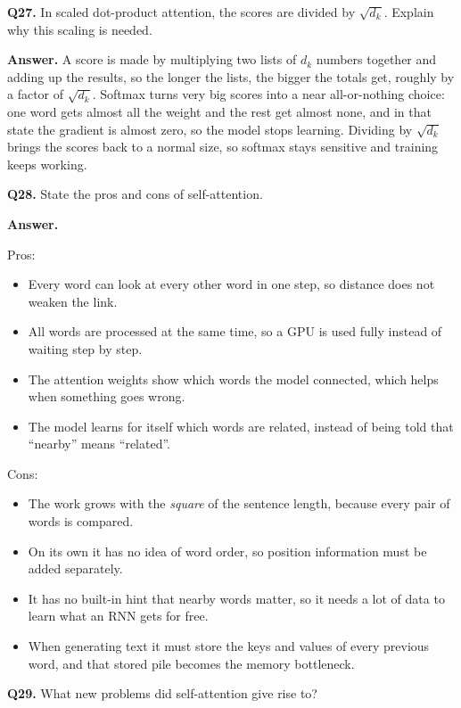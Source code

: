 \documentclass[11pt]{article}
\begin{document}
\medskip
\textbf{Q27.} In scaled dot-product attention, the scores are divided by $\sqrt{d_k}$.
Explain why this scaling is needed.

\textbf{Answer.} A score is made by multiplying two lists of $d_k$ numbers together and adding
up the results, so the longer the lists, the bigger the totals get, roughly by a factor of
$\sqrt{d_k}$. Softmax turns very big scores into a near all-or-nothing choice: one word gets
almost all the weight and the rest get almost none, and in that state the gradient is almost
zero, so the model stops learning. Dividing by $\sqrt{d_k}$ brings the scores back to a normal
size, so softmax stays sensitive and training keeps working.

\medskip
\textbf{Q28.} State the pros and cons of self-attention.

\textbf{Answer.}

Pros:
\begin{itemize}
  \item Every word can look at every other word in one step, so distance does not weaken the link.
  \item All words are processed at the same time, so a GPU is used fully instead of waiting step by step.
  \item The attention weights show which words the model connected, which helps when something goes wrong.
  \item The model learns for itself which words are related, instead of being told that ``nearby'' means ``related''.
\end{itemize}

Cons:
\begin{itemize}
  \item The work grows with the \emph{square} of the sentence length, because every pair of words is compared.
  \item On its own it has no idea of word order, so position information must be added separately.
  \item It has no built-in hint that nearby words matter, so it needs a lot of data to learn what an RNN gets for free.
  \item When generating text it must store the keys and values of every previous word, and that stored pile becomes the memory bottleneck.
\end{itemize}

\medskip
\textbf{Q29.} What new problems did self-attention give rise to?
\end{document}
